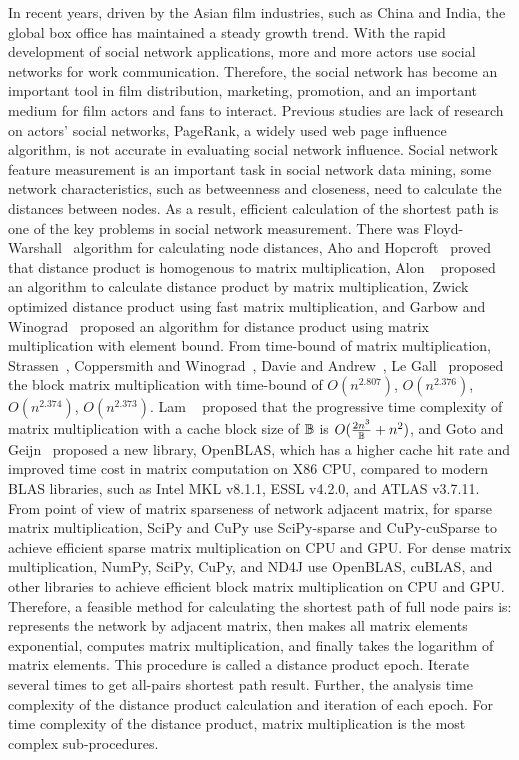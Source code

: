 \documentclass[10pt,twocolumn,letterpaper]{article}
\begin{document}
In recent years, driven by the Asian film industries, such as China and India, the global box office has maintained a steady growth trend.
With the rapid development of social network applications, more and more actors use social networks for work communication.
Therefore, the social network has become an important tool in film distribution, marketing, promotion, and an important medium for film actors and fans to interact.
Previous studies are lack of research on actors' social networks, PageRank, a widely used web page influence algorithm, is not accurate in evaluating social network influence.
Social network feature measurement is an important task in social network data mining, some network characteristics, such as betweenness and closeness, need to calculate the distances between nodes.
As a result, efficient calculation of the shortest path is one of the key problems in social network measurement.
There was Floyd-Warshall~\cite{floyd1962algorithm,warshall1962theorem} algorithm for calculating node distances, Aho and Hopcroft~\cite{aho1974design} proved that distance product is homogenous to matrix multiplication,
Alon \etal~\cite{alon1997exponent} proposed an algorithm to calculate distance product by matrix multiplication, Zwick~\cite{zwick2002all} optimized distance product using fast matrix multiplication,
and Garbow and Winograd~\cite{garbow1985scaling} proposed an algorithm for distance product using matrix multiplication with element bound.
From time-bound of matrix multiplication, Strassen~\cite{strassen1969gaussian}, Coppersmith and Winograd~\cite{coppersmith1987matrix}, Davie and Andrew~\cite{davie2013improved}, Le Gall~\cite{le2014powers} proposed the block matrix multiplication with time-bound of \(O(n ^ {2.807})\), \(O(n^{2.376})\), \(O(n^{2.374})\), \(O(n^{2.373})\).
Lam \etal~\cite{lam1991cache} proposed that the progressive time complexity of matrix multiplication with a cache block size of $\Bbb B$ is \(O({2n^3 \over \Bbb B}+{n^2})\),
and Goto and Geijn~\cite{goto2008anatomy} proposed a new library, OpenBLAS, which has a higher cache hit rate and improved time cost in matrix computation on X86 CPU, compared to modern BLAS libraries, such as Intel MKL v8.1.1, ESSL v4.2.0, and ATLAS v3.7.11.
From point of view of matrix sparseness of network adjacent matrix, for sparse matrix multiplication, SciPy and CuPy use SciPy-sparse and CuPy-cuSparse to achieve efficient sparse matrix multiplication on CPU and GPU.
For dense matrix multiplication, NumPy, SciPy, CuPy, and ND4J use OpenBLAS, cuBLAS, and other libraries to achieve efficient block matrix multiplication on CPU and GPU.
Therefore, a feasible method for calculating the shortest path of full node pairs is: represents the network by adjacent matrix, then makes all matrix elements exponential, computes matrix multiplication, and finally takes the logarithm of matrix elements.
This procedure is called a distance product epoch.
Iterate several times to get all-pairs shortest path result.
Further, the analysis time complexity of the distance product calculation and iteration of each epoch.
For time complexity of the distance product, matrix multiplication is the most complex sub-procedures.
\end{document}
